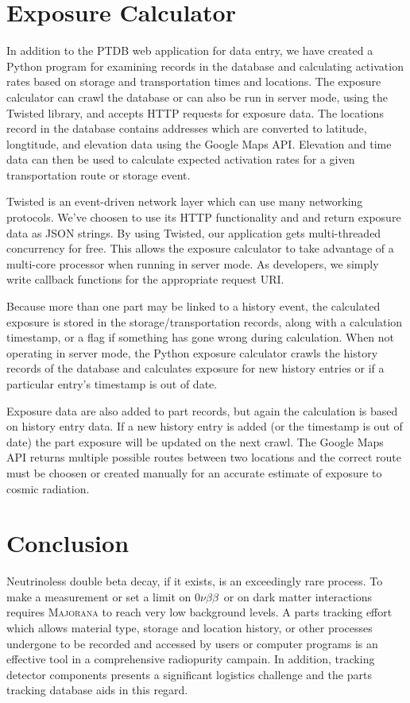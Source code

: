 \documentclass[journal]{IEEEtran}
\def\znbb{0$\nu\beta\beta$}
\begin{document}
\section{Exposure Calculator}

In addition to the PTDB web application for data entry, we have created a Python program for
examining records in the database and calculating activation rates based on storage and 
transportation times and locations. The exposure calculator can crawl the database or can
also be run in server mode, using the Twisted library, and accepts HTTP requests for
exposure data. The locations record in the database contains addresses which
are converted to latitude, longtitude, and elevation data using the Google Maps API. Elevation and time data can
then be used to calculate expected activation rates for a given transportation route
or storage event.

Twisted is an event-driven network layer which can use many networking protocols. We've 
choosen to use its HTTP functionality and and return exposure data as JSON strings. By
using Twisted, our application gets multi-threaded concurrency for free. This allows
the exposure calculator to take advantage of a multi-core processor when running in 
server mode. As developers, we simply write callback functions for the appropriate request URI.

Because more than one part may be linked to a history event, the calculated exposure is
stored in the storage/transportation records, along with a calculation timestamp, or a flag
if something has gone wrong during calculation. When not operating in server mode, the Python
exposure calculator crawls the history records of the database and calculates exposure for
new history entries or if a particular entry's timestamp is out of date. 

Exposure data are also added to part records, but again the calculation is based on history
entry data. If a new history entry is added (or the timestamp is out of date) the part
exposure will be updated on the next crawl. The Google Maps API returns multiple possible
routes between two locations and the correct route must be choosen or created
manually for an accurate estimate of exposure to cosmic radiation.

\section{Conclusion}

Neutrinoless double beta decay, if it exists, is an exceedingly rare process.
To make a measurement or set a limit on \znbb\ or on dark matter interactions 
requires \textsc{Majorana} to reach very low background levels. A parts tracking effort which allows material type,
storage and location history, or other processes undergone to be recorded and
accessed by users or computer programs is an effective tool in a comprehensive
radiopurity campain. In addition, tracking detector components presents a significant
logistics challenge and the parts tracking database aids in this regard.
\end{document}
